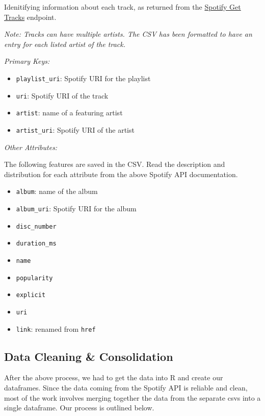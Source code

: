 \documentclass[
]{article}
\providecommand{\tightlist}{%
  \setlength{\itemsep}{0pt}\setlength{\parskip}{0pt}}
\begin{document}
Idenitifying information about each track, as returned from the
\href{https://developer.spotify.com/documentation/web-api/reference/tracks/get-several-tracks/}{Spotify
Get Tracks} endpoint.

\emph{Note: Tracks can have multiple artists. The CSV has been formatted
to have an entry for each listed artist of the track.}

\emph{Primary Keys:}

\begin{itemize}
\tightlist
\item
  \texttt{playlist\_uri}: Spotify URI for the playlist
\item
  \texttt{uri}: Spotify URI of the track
\item
  \texttt{artist}: name of a featuring artist
\item
  \texttt{artist\_uri}: Spotify URI of the artist
\end{itemize}

\emph{Other Attributes:}

The following features are saved in the CSV. Read the description and
distribution for each attribute from the above Spotify API
documentation.

\begin{itemize}
\tightlist
\item
  \texttt{album}: name of the album
\item
  \texttt{album\_uri}: Spotify URI for the album
\item
  \texttt{disc\_number}
\item
  \texttt{duration\_ms}
\item
  \texttt{name}
\item
  \texttt{popularity}
\item
  \texttt{explicit}
\item
  \texttt{uri}
\item
  \texttt{link}: renamed from \texttt{href}
\end{itemize}

\hypertarget{data-cleaning-consolidation}{%
\subsection{Data Cleaning \&
Consolidation}\label{data-cleaning-consolidation}}

After the above process, we had to get the data into R and create our
dataframes. Since the data coming from the Spotify API is reliable and
clean, most of the work involves merging together the data from the
separate csvs into a single dataframe. Our process is outlined below.
\end{document}

